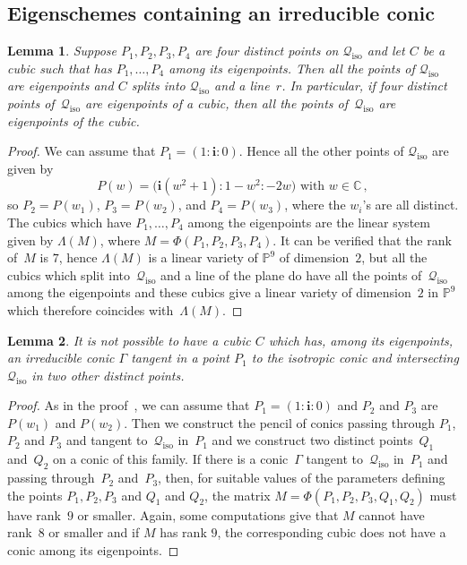 \documentclass{amsart}
\theoremstyle{plain}
\newtheorem{lemma}{Lemma}[section]
\theoremstyle{definition}
\newcommand{\C}{\mathbb{C}}
\newcommand{\p}{\mathbb{P}}
\newcommand{\iso}{\mathcal{Q}_{\mathrm{iso}}}
\newcommand{\iii}{\textbf{i}}
\begin{document}
\subsection{Eigenschemes containing an irreducible conic}
\begin{lemma}
\label{lemma:fourOnIso}
Suppose $P_1, P_2, P_3, P_4$ are four distinct points on $\iso$ and let
$C$ be a cubic such that has $P_1, \dots, P_4$ among its eigenpoints.
Then all the points of $\iso$ are eigenpoints and $C$ splits into $\iso$
and a line~$r$. In particular, if four
distinct points of~$\iso$ are eigenpoints of a cubic, then all the
points of~$\iso$ are eigenpoints of the cubic.
\end{lemma}
\begin{proof}
We can assume that $P_1 = (1: \iii: 0)$. Hence all the other points
of $\iso$ are given by
%
\[
  P(w) = \bigl(\iii(w^2 + 1): 1 - w^2: -2w\bigr) \text{ with } w \in \C \,,
\]
%
so $P_2 = P(w_1)$, $P_3 = P(w_2)$, and $P_4 = P(w_3)$, where the $w_i$'s are
all distinct. The cubics which have $P_1, \dots, P_4$ among the eigenpoints
are the linear system given by $\Lambda (M)$, where $M = \Phi(P_1, P_2, P_3, P_4)$.
It can be verified that the rank of~$M$ is $7$, hence $\Lambda(M)$ is a linear variety of $\p^9$ of dimension~$2$, but all the cubics which split into~$\iso$ and a line
of the plane do have all the points of~$\iso$ among the eigenpoints and
these cubics give a linear variety of dimension~$2$ in $\p^9$
which therefore coincides 
with~$\Lambda(M)$.
\end{proof}

\begin{lemma}
\label{lemma3ptiSuCiso}
It is not possible to have a cubic $C$ which has, among its eigenpoints,
an irreducible conic $\Gamma$ tangent in a point $P_1$ to the isotropic
conic and intersecting $\iso$ in two other distinct points.
\end{lemma}
\begin{proof}
As in the proof~, we can assume that
$P_1 = (1: \iii: 0)$
and $P_2$ and $P_3$ are $P(w_1)$ and $P(w_2)$. Then we construct
the pencil of conics passing through $P_1$, $P_2$ and $P_3$ and
tangent to~$\iso$ in~$P_1$ and we construct two distinct points~$Q_1$ and~$Q_2$ on a conic of this family. If there is a conic~$\Gamma$
tangent to~$\iso$ in~$P_1$ and passing through~$P_2$ and~$P_3$,
then, for suitable values of the parameters defining the points
$P_1, P_2, P_3$ and $Q_1$ and $Q_2$, the matrix
$M = \Phi(P_1, P_2, P_3, Q_1, Q_2)$
must have rank~$9$ or smaller. Again, 
some computations give that $M$ cannot 
have rank~$8$ or smaller and if $M$ has rank $9$, the corresponding cubic 
does not have a conic among its eigenpoints.
\end{proof}
\end{document}
